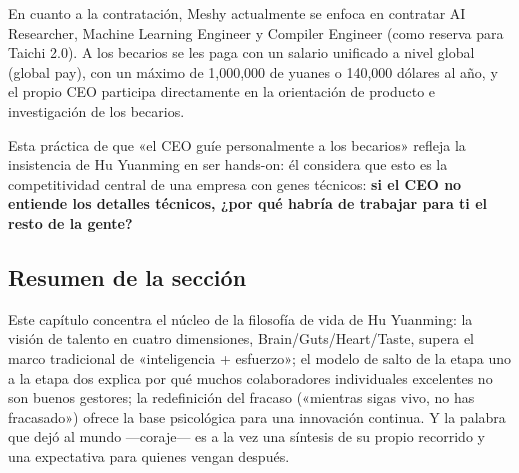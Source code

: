 En cuanto a la contratación, Meshy actualmente se enfoca en contratar AI Researcher, Machine Learning Engineer y Compiler Engineer (como reserva para Taichi 2.0). A los becarios se les paga con un salario unificado a nivel global (global pay), con un máximo de 1,000,000 de yuanes o 140,000 dólares al año, y el propio CEO participa directamente en la orientación de producto e investigación de los becarios.

Esta práctica de que «el CEO guíe personalmente a los becarios» refleja la insistencia de Hu Yuanming en ser hands-on: él considera que esto es la competitividad central de una empresa con genes técnicos: \textbf{si el CEO no entiende los detalles técnicos, ¿por qué habría de trabajar para ti el resto de la gente?}

\subsection{Resumen de la sección}

Este capítulo concentra el núcleo de la filosofía de vida de Hu Yuanming: la visión de talento en cuatro dimensiones, Brain/Guts/Heart/Taste, supera el marco tradicional de «inteligencia + esfuerzo»; el modelo de salto de la etapa uno a la etapa dos explica por qué muchos colaboradores individuales excelentes no son buenos gestores; la redefinición del fracaso («mientras sigas vivo, no has fracasado») ofrece la base psicológica para una innovación continua. Y la palabra que dejó al mundo —coraje— es a la vez una síntesis de su propio recorrido y una expectativa para quienes vengan después.
